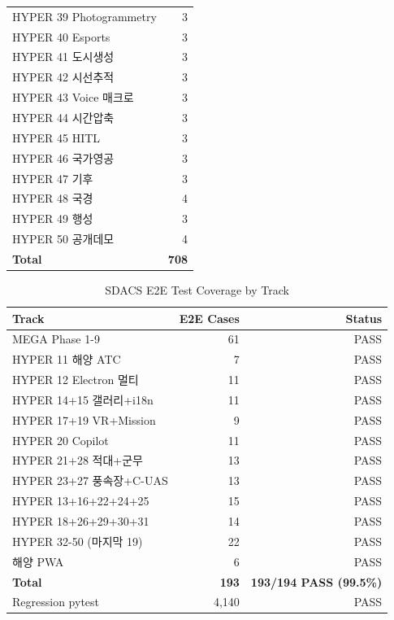 \begin{table}[h]
\begin{tabular}{lr}
HYPER 39 Photogrammetry & 3 \\
HYPER 40 Esports & 3 \\
HYPER 41 도시생성 & 3 \\
HYPER 42 시선추적 & 3 \\
HYPER 43 Voice 매크로 & 3 \\
HYPER 44 시간압축 & 3 \\
HYPER 45 HITL & 3 \\
HYPER 46 국가영공 & 3 \\
HYPER 47 기후 & 3 \\
HYPER 48 국경 & 4 \\
HYPER 49 행성 & 3 \\
HYPER 50 공개데모 & 4 \\
\hline
\textbf{Total} & \textbf{708} \\
\hline
\end{tabular}
\end{table}

\begin{table}[h]
\centering
\caption{SDACS E2E Test Coverage by Track}
\label{tab:sdacs-e2e}
\begin{tabular}{lrr}
\hline
Track & E2E Cases & Status \\
\hline
MEGA Phase 1-9 & 61 & PASS \\
HYPER 11 해양 ATC & 7 & PASS \\
HYPER 12 Electron 멀티 & 11 & PASS \\
HYPER 14+15 갤러리+i18n & 11 & PASS \\
HYPER 17+19 VR+Mission & 9 & PASS \\
HYPER 20 Copilot & 11 & PASS \\
HYPER 21+28 적대+군무 & 13 & PASS \\
HYPER 23+27 풍속장+C-UAS & 13 & PASS \\
HYPER 13+16+22+24+25 & 15 & PASS \\
HYPER 18+26+29+30+31 & 14 & PASS \\
HYPER 32-50 (마지막 19) & 22 & PASS \\
해양 PWA & 6 & PASS \\
\hline
\textbf{Total} & \textbf{193} & \textbf{193/194 PASS (99.5\%)} \\
\hline
Regression pytest & 4,140 & PASS \\
\hline
\end{tabular}
\end{table}